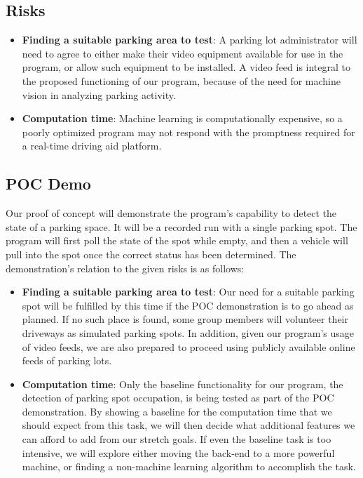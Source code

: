 \documentclass[12pt,letterpaper]{article}
\begin{document}
\subsection{Risks}
\begin{itemize}
    \item \textbf{Finding a suitable parking area to test}: A parking lot
    administrator will need to agree to either make their video equipment
    available for use in the program, or allow such equipment to be installed. A
    video feed is integral to the proposed functioning of our program, because
    of the need for machine vision in analyzing parking activity.
    \item \textbf{Computation time}: Machine learning is computationally
    expensive, so a poorly optimized program may not respond with the promptness
    required for a real-time driving aid platform. 
\end{itemize}

\subsection{POC Demo}
Our proof of concept will demonstrate the program's capability to detect the
state of a parking space. It will be a recorded run with a single parking spot.
The program will first poll the state of the spot while empty, and then a
vehicle will pull into the spot once the correct status has been determined. The
demonstration's relation to the given risks is as follows:
\begin{itemize}
    \item \textbf{Finding a suitable parking area to test}: Our need for a
    suitable parking spot will be fulfilled by this time if the POC
    demonstration is to go ahead as planned. If no such place is found, some
    group members will volunteer their driveways as simulated parking spots. In
    addition, given our program's usage of video feeds, we are also prepared to
    proceed using publicly available online feeds of parking lots.
    \item \textbf{Computation time}: Only the baseline functionality for our
    program, the detection of parking spot occupation, is being tested as part
    of the POC demonstration. By showing a baseline for the computation time
    that we should expect from this task, we will then decide what additional
    features we can afford to add from our stretch goals. If even the baseline
    task is too intensive, we will explore either moving the back-end to a more
    powerful machine, or finding a non-machine learning algorithm to accomplish
    the task.
\end{itemize}
\end{document}
